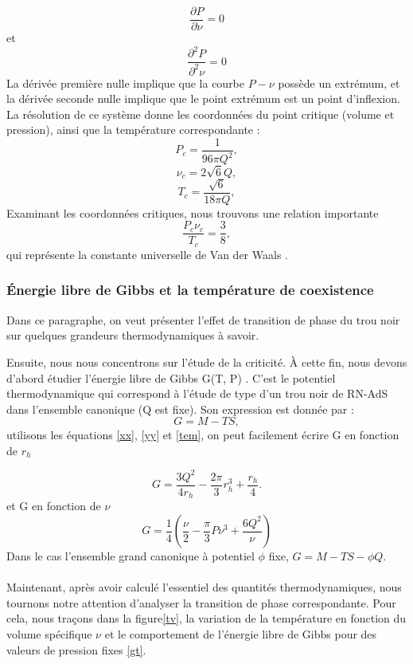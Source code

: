 \documentclass[12pt,  a4paper, openright]{report} %
\begin{document}
\begin{equation}
\dfrac{\partial P}{\partial \nu}=0  
\end{equation}
et
\begin{equation}
\dfrac{\partial^{2} P}{\partial^{2} \nu}=0
\end{equation}
La dérivée première nulle implique que la courbe $ P - \nu$ possède un extrémum, et la dérivée
seconde nulle implique que le point extrémum est un point d’inflexion.
La résolution de ce système donne les coordonnées du point critique (volume et pression), ainsi
que la température correspondante :
\begin{equation}
\label{pc}
P_{c}=\dfrac{1}{96\pi Q^{2}},
\end{equation}
\begin{equation}
\label{tc}
\nu_{c}=2\sqrt{6}Q,
\end{equation}
\begin{equation}
\label{vc}
T_{c}=\dfrac{\sqrt{6}}{18\pi Q},
\end{equation}
Examinant les coordonnées critiques, nous trouvons une relation importante
\begin{equation}
\dfrac{P_{c}\nu_{c}}{T_{c}}=\dfrac{3}{8},
\end{equation}
qui représente la constante universelle de Van der Waals .
\subsubsection{Énergie libre de Gibbs et la température de coexistence}
Dans ce paragraphe, on veut présenter l’effet de transition de phase du trou noir sur quelques
grandeurs thermodynamiques à savoir.

Ensuite, nous nous concentrons sur l’étude de la criticité. À cette fin, nous devons d’abord étudier
l’énergie libre de Gibbs G(T, P) . C’est le potentiel thermodynamique qui correspond à l’étude de type d’un
trou noir de RN-AdS dans l’ensemble canonique (Q est fixe). Son expression est donnée par :
\begin{equation}
G = M - TS,
\end{equation}
utilisons les équations \ref{xx}, \ref{yy} et \ref{tem}, on peut facilement écrire G en fonction de $r_{h}$

\begin{equation}
G=\dfrac{3Q^{2}}{4r_{h}}-\dfrac{2\pi}{3}r_{h}^{3}+\dfrac{r_{h}}{4}.
\end{equation}
et G  en fonction de $\nu$ 
\begin{equation}
G=\dfrac{1}{4}\left(\dfrac{\nu}{2}-\dfrac{\pi}{3}P\nu^{3}+\dfrac{6Q^{2}}{\nu} \right) 
\end{equation}
Dans le cas l'ensemble grand canonique à potentiel $\phi $ fixe, 
$G = M-TS-\phi Q$.\\
\\
Maintenant, après avoir calculé l'essentiel des quantités thermodynamiques, nous tournons notre attention
d'analyser la transition de phase correspondante. Pour cela, nous traçons dans la figure\ref{tv}, la variation de la température en fonction du volume
spécifique $\nu$ et  le comportement de l'énergie libre de Gibbs pour des valeurs de pression fixes \ref{gt}.
\end{document}
